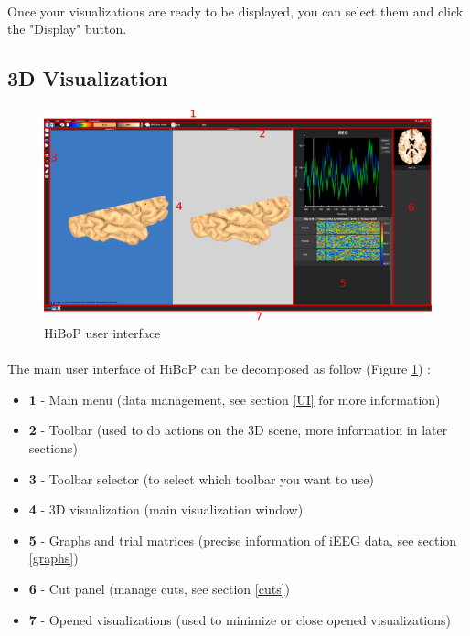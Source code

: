 \documentclass[a4paper]{article}
\begin{document}
\paragraph{} Once your visualizations are ready to be displayed, you can select them and click the "Display" button.
\subsection{3D Visualization}
\paragraph{}
\begin{figure}[H]
\begin{center}
\includegraphics[scale=0.7]{GlobalUI.png}
\end{center}
\caption{\label{globalUI}HiBoP user interface}
\end{figure}
\paragraph{} The main user interface of HiBoP can be decomposed as follow (Figure \ref{globalUI}) :
\begin{itemize}
\item \textbf{1} - Main menu (data management, see section \ref{UI} for more information)
\item \textbf{2} - Toolbar (used to do actions on the 3D scene, more information in later sections)
\item \textbf{3} - Toolbar selector (to select which toolbar you want to use)
\item \textbf{4} - 3D visualization (main visualization window)
\item \textbf{5} - Graphs and trial matrices (precise information of iEEG data, see section \ref{graphs})
\item \textbf{6} - Cut panel (manage cuts, see section \ref{cuts})
\item \textbf{7} - Opened visualizations (used to minimize or close opened visualizations)
\end{itemize}
\end{document}
